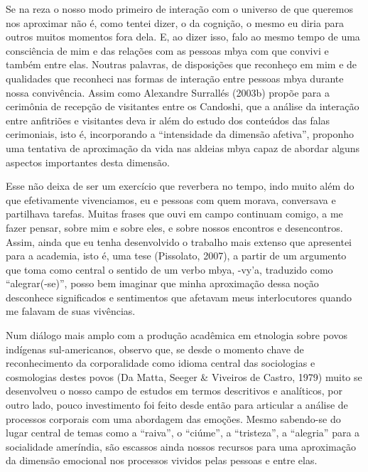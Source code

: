 Se na reza o nosso modo primeiro de interação com o universo de que
queremos nos aproximar não é, como tentei dizer, o da cognição, o mesmo
eu diria para outros muitos momentos fora dela. E, ao dizer isso, falo
ao mesmo tempo de uma consciência de mim e das relações com as pessoas
mbya com que convivi e também entre elas. Noutras palavras, de
disposições que reconheço em mim e de qualidades que reconheci nas
formas de interação entre pessoas mbya durante nossa convivência. Assim
como Alexandre Surrallés (2003b) propõe para a cerimônia de recepção de
visitantes entre os Candoshi, que a análise da interação entre
anfitriões e visitantes deva ir além do estudo dos conteúdos das falas
cerimoniais, isto é, incorporando a ``intensidade da dimensão afetiva'',
proponho uma tentativa de aproximação da vida nas aldeias mbya capaz de
abordar alguns aspectos importantes desta dimensão.

Esse não deixa de ser um exercício que reverbera no tempo, indo muito
além do que efetivamente vivenciamos, eu e pessoas com quem morava,
conversava e partilhava tarefas. Muitas frases que ouvi em campo
continuam comigo, a me fazer pensar, sobre mim e sobre eles, e sobre
nossos encontros e desencontros. Assim, ainda que eu tenha desenvolvido
o trabalho mais extenso que apresentei para a academia, isto é, uma
tese (Pissolato, 2007), a partir de um argumento que toma como central
o sentido de um verbo mbya, -vy’a, traduzido como ``alegrar(-se)'', posso
bem imaginar que minha aproximação dessa noção desconhece significados
e sentimentos que afetavam meus interlocutores quando me falavam de
suas vivências.

Num diálogo mais amplo com a produção acadêmica em etnologia sobre povos
indígenas sul-americanos, observo que, se desde o momento chave de
reconhecimento  da corporalidade como idioma central das sociologias e
cosmologias destes povos (Da Matta, Seeger \& Viveiros de Castro,
1979) muito se desenvolveu o nosso campo de estudos em termos
descritivos e analíticos, por outro lado, pouco investimento foi feito
desde então para articular a análise de processos corporais com uma
abordagem das emoções. Mesmo sabendo-se do lugar central de temas como
a ``raiva'', o ``ciúme'', a ``tristeza'', a ``alegria'' para a socialidade
ameríndia, são escassos ainda nossos recursos para uma aproximação da
dimensão emocional nos processos vividos pelas pessoas e entre elas.

